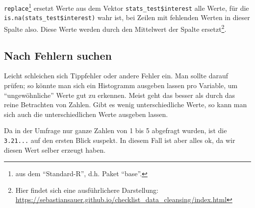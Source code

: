 \documentclass[12pt,ngerman,]{book}
\makeatletter
\newenvironment{Shaded}{\begin{snugshade}}{\end{snugshade}}
\newcommand{\KeywordTok}[1]{\textcolor[rgb]{0.13,0.29,0.53}{\textbf{{#1}}}}
\newcommand{\DataTypeTok}[1]{\textcolor[rgb]{0.13,0.29,0.53}{{#1}}}
\newcommand{\StringTok}[1]{\textcolor[rgb]{0.31,0.60,0.02}{{#1}}}
\newcommand{\CommentTok}[1]{\textcolor[rgb]{0.56,0.35,0.01}{\textit{{#1}}}}
\newcommand{\OtherTok}[1]{\textcolor[rgb]{0.56,0.35,0.01}{{#1}}}
\newcommand{\NormalTok}[1]{{#1}}
\let\rmarkdownfootnote\footnote%
\def\footnote{\protect\rmarkdownfootnote}
\newenvironment{kframe}{%
\medskip{}
\setlength{\fboxsep}{.8em}
 \def\at@end@of@kframe{}%
 \ifinner\ifhmode%
  \def\at@end@of@kframe{\end{minipage}}%
  \begin{minipage}{\columnwidth}%
 \fi\fi%
 \def\FrameCommand##1{\hskip\@totalleftmargin \hskip-\fboxsep
 \colorbox{shadecolor}{##1}\hskip-\fboxsep
     \hskip-\linewidth \hskip-\@totalleftmargin \hskip\columnwidth}%
 \MakeFramed {\advance\hsize-\width
   \@totalleftmargin\z@ \linewidth\hsize
   \@setminipage}}%
 {\par\unskip\endMakeFramed%
 \at@end@of@kframe}
\renewenvironment{Shaded}{\begin{kframe}}{\end{kframe}}
\makeatother
\begin{document}
\begin{Shaded}
\end{Shaded}

\texttt{replace}\footnote{aus dem ``Standard-R'', d.h. Paket ``base''.}
ersetzt Werte aus dem Vektor \texttt{stats\_test\$interest} alle Werte,
für die \texttt{is.na(stats\_test\$interest)} wahr ist, bei Zeilen mit
fehlenden Werten in dieser Spalte also. Diese Werte werden durch den
Mittelwert der Spalte ersetzt\footnote{Hier findet sich eine
  ausführlichere Darstellung:
  \url{https://sebastiansauer.github.io/checklist_data_cleansing/index.html}}.

\subsection{Nach Fehlern suchen}\label{nach-fehlern-suchen}

Leicht schleichen sich Tippfehler oder andere Fehler ein. Man sollte
darauf prüfen; so könnte man sich ein Histogramm ausgeben lassen pro
Variable, um ``ungewöhnliche'' Werte gut zu erkennen. Meist geht das
besser als durch das reine Betrachten von Zahlen. Gibt es wenig
unterschiedliche Werte, so kann man sich auch die unterschiedlichen
Werte ausgeben lassen.

\begin{Shaded}
\end{Shaded}

Da in der Umfrage nur ganze Zahlen von 1 bis 5 abgefragt wurden, ist die
\texttt{3.21...} auf den ersten Blick suspekt. In diesem Fall ist aber
alles ok, da wir diesen Wert selber erzeugt haben.
\end{document}
